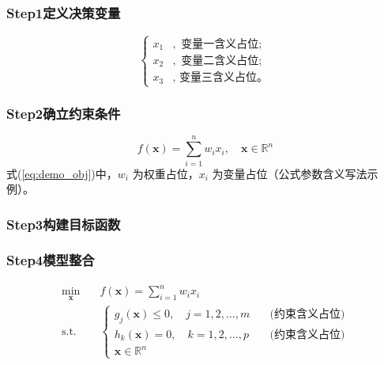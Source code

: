 \documentclass{MathorCupmodeling}
\begin{document}
\subsubsection*{Step1定义决策变量}

\begin{equation*}
	\left\{
	\begin{aligned}
		x_1 &,\text{ 变量一含义占位};\\
		x_2 &,\text{ 变量二含义占位};\\
		x_3 &,\text{ 变量三含义占位。}
	\end{aligned}
	\right.
\end{equation*}

\subsubsection*{Step2确立约束条件}

\begin{equation}
	f(\boldsymbol{x})=\sum_{i=1}^{n} w_i x_i,\quad \boldsymbol{x}\in\mathbb{R}^{n}
	\label{eq:demo_obj}
\end{equation}
式(\ref{eq:demo_obj})中，$w_i$ 为权重占位，$x_i$ 为变量占位（公式参数含义写法示例）。

\subsubsection*{Step3构建目标函数}

\subsubsection*{Step4模型整合}
\begin{equation*}
	\begin{aligned}
		\min_{\boldsymbol{x}} \quad & f(\boldsymbol{x})=\sum_{i=1}^{n} w_i x_i \\
		\text{s.t.} \quad
		& \begin{cases}
			g_j(\boldsymbol{x}) \le 0, \quad j=1,2,\dots,m \quad &\text{(约束含义占位)}\\
			h_k(\boldsymbol{x}) = 0, \quad k=1,2,\dots,p \quad &\text{(约束含义占位)}\\
			\boldsymbol{x}\in\mathbb{R}^{n}
		\end{cases}
	\end{aligned}
\end{equation*}
\end{document}
